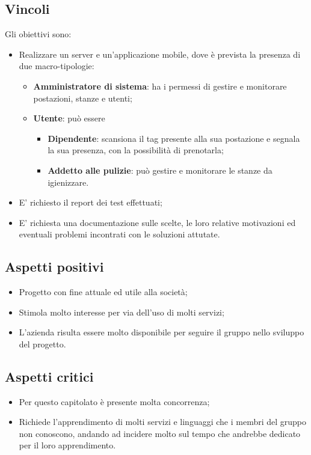 \subsection{Vincoli}
Gli obiettivi sono:
\begin{itemize}
\item	Realizzare un server e un'applicazione mobile, dove è prevista la presenza di due macro-tipologie:
\begin{itemize}
\item	\textbf{Amministratore di sistema}: ha i permessi di gestire e monitorare postazioni, stanze e utenti;
\item	\textbf{Utente}: può essere 

\begin{itemize}
\item \textbf{Dipendente}: scansiona il tag presente alla sua postazione e segnala la sua presenza, con la possibilità di prenotarla;

\item \textbf{Addetto alle pulizie}: può gestire e monitorare le stanze da igienizzare.
\end{itemize}

\end{itemize}
\item	E' richiesto il report dei test effettuati;
\item	E' richiesta una documentazione sulle scelte, le loro relative motivazioni ed eventuali problemi incontrati con le soluzioni attutate.
\end{itemize}

\subsection{Aspetti positivi}
\begin{itemize}
\item	Progetto con fine attuale ed utile alla società;
\item	Stimola molto interesse per via dell'uso di molti servizi;
\item	L'azienda risulta essere molto disponibile per seguire il gruppo nello sviluppo del progetto.
\end{itemize}
\subsection{Aspetti critici}
\begin{itemize}
\item	Per questo capitolato è presente molta concorrenza;
\item	Richiede l'apprendimento di molti servizi e linguaggi che i membri del gruppo non conoscono, andando ad incidere molto sul tempo che andrebbe dedicato per il loro apprendimento.
\end{itemize}


